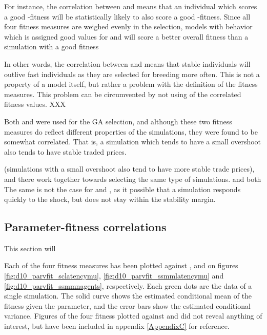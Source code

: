 For instance, the correlation between \overshoot and \stdev means that an individual which scores a good \overshoot-fitness will be statistically likely to also score a good \stdev-fitness. Since all four fitness measures are weighed evenly in the selection, models with behavior which is assigned good values for \overshoot and \stdev will score a better overall fitness than a simulation with a good fitness 

In other words, the correlation between \stdev and \overshoot means that stable individuals will outlive fast individuals as they are selected for breeding more often. This is not a property of a model itself, but rather a problem with the definition of the fitness measures. This problem can be circumvented by not using of the correlated fitness values. XXX

Both \overshoot and \stdev were used for the GA selection, and although these two fitness measures do reflect different properties of the simulations, they were found to be somewhat correlated. That is, a simulation which tends to have a small overshoot also tends to have stable traded prices. 

 (simulations with a small overshoot also tend to have more stable trade prices), and there work together towards selecting the same type of simulations. \timetoreachnewfundamental and \roundstable both  The same is not the case for \timetoreachnewfundamental and \roundstable, as it possible that a simulation responds quickly to the shock, but does not stay within the stability margin. 

\subsection{Parameter-fitness correlations}
This section will 

Each of the four fitness measures has been plotted against \sclatencymu, \ssmmlatencymu and \ssmmnAgents on figures \ref{fig:d10_parvfit_sclatencymu}, \ref{fig:d10_parvfit_ssmmlatencymu} and \ref{fig:d10_parvfit_ssmmnagents}, respectively. Each green dots are the data of a single simulation. The solid curve shows the estimated conditional mean of the fitness given the parameter, and the error bars show the estimated conditional variance. Figures of the four fitness plotted against \sclatencys and \ssmmlatencys did not reveal anything of interest, but have been included in appendix \ref{AppendixC} for reference.

